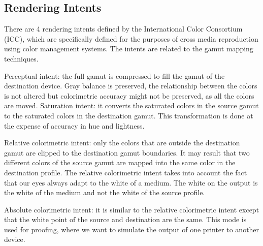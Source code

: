 \documentclass{amsart}
\theoremstyle{definition}
\theoremstyle{remark}
\numberwithin{equation}{section}
\begin{document}
\subsection{Rendering Intents}
There are 4 rendering intents defined by the International Color Consortium (ICC), which are
specifically defined for the purposes of cross media reproduction using color management
systems. The intents are related to the gamut mapping techniques.

Perceptual intent: the full gamut is compressed to fill the gamut of the destination
device. Gray balance is preserved, the relationship between the colors is not altered
but colorimetric accuracy might not be preserved, as all the colors are moved.
Saturation intent: it converts the saturated colors in the source gamut to the saturated
colors in the destination gamut. This transformation is done at the expense of
accuracy in hue and lightness.

Relative colorimetric intent: only the colors that are outside the destination gamut are
clipped to the destination gamut boundaries. It may result that two different colors of
the source gamut are mapped into the same color in the destination profile. The
relative colorimetric intent takes into account the fact that our eyes always adapt to the white of a medium. The white on the output is the white of the medium and not the
white of the source profile.

Absolute colorimetric intent: it is similar to the relative colorimetric intent except that
the white point of the source and destination are the same. This mode is used for
proofing, where we want to simulate the output of one printer to another device.
\end{document}
